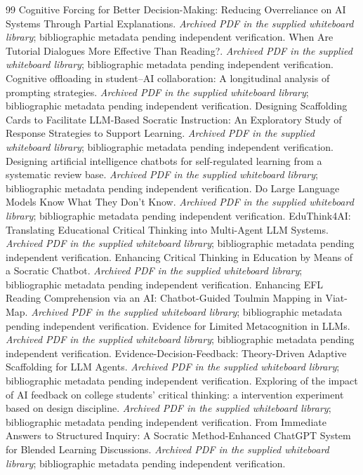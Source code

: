 \begin{thebibliography}{99}
 Cognitive Forcing for Better Decision-Making: Reducing Overreliance on AI Systems Through Partial Explanations. \emph{Archived PDF in the supplied whiteboard library}; bibliographic metadata pending independent verification.
 When Are Tutorial Dialogues More Effective Than Reading?. \emph{Archived PDF in the supplied whiteboard library}; bibliographic metadata pending independent verification.
 Cognitive offloading in student--AI collaboration: A longitudinal analysis of prompting strategies. \emph{Archived PDF in the supplied whiteboard library}; bibliographic metadata pending independent verification.
 Designing Scaffolding Cards to Facilitate LLM-Based Socratic Instruction: An Exploratory Study of Response Strategies to Support Learning. \emph{Archived PDF in the supplied whiteboard library}; bibliographic metadata pending independent verification.
 Designing artificial intelligence chatbots for self-regulated learning from a systematic review base. \emph{Archived PDF in the supplied whiteboard library}; bibliographic metadata pending independent verification.
 Do Large Language Models Know What They Don't Know. \emph{Archived PDF in the supplied whiteboard library}; bibliographic metadata pending independent verification.
 EduThink4AI: Translating Educational Critical Thinking into Multi-Agent LLM Systems. \emph{Archived PDF in the supplied whiteboard library}; bibliographic metadata pending independent verification.
 Enhancing Critical Thinking in Education by Means of a Socratic Chatbot. \emph{Archived PDF in the supplied whiteboard library}; bibliographic metadata pending independent verification.
 Enhancing EFL Reading Comprehension via an AI: Chatbot-Guided Toulmin Mapping in Viat-Map. \emph{Archived PDF in the supplied whiteboard library}; bibliographic metadata pending independent verification.
 Evidence for Limited Metacognition in LLMs. \emph{Archived PDF in the supplied whiteboard library}; bibliographic metadata pending independent verification.
 Evidence-Decision-Feedback: Theory-Driven Adaptive Scaffolding for LLM Agents. \emph{Archived PDF in the supplied whiteboard library}; bibliographic metadata pending independent verification.
 Exploring of the impact of AI feedback on college students' critical thinking: a intervention experiment based on design discipline. \emph{Archived PDF in the supplied whiteboard library}; bibliographic metadata pending independent verification.
 From Immediate Answers to Structured Inquiry: A Socratic Method-Enhanced ChatGPT System for Blended Learning Discussions. \emph{Archived PDF in the supplied whiteboard library}; bibliographic metadata pending independent verification.

\end{thebibliography}
